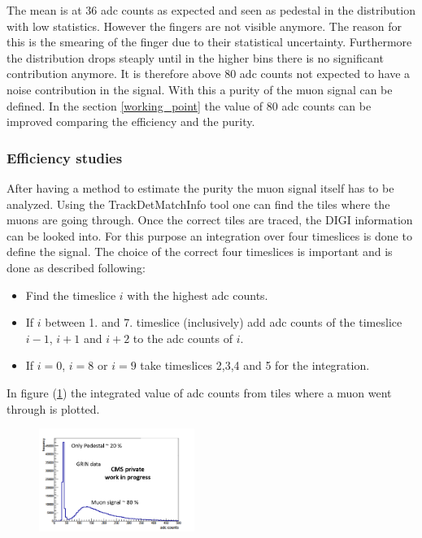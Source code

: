 			The mean is at 36 adc counts as expected and seen as pedestal in the distribution with low statistics.
			However the fingers are not visible anymore.
			The reason for this is the smearing of the finger due to their statistical uncertainty.
			Furthermore the distribution drops steaply until in the higher bins there is no significant contribution anymore.
			It is therefore above 80 adc counts not expected to have a noise contribution in the signal.
			With this a purity of the muon signal can be defined.
			In the section \ref{working_point} the value of 80 adc counts can be improved comparing the efficiency and the purity.
		\subsubsection{Efficiency studies}
			After having a method to estimate the purity the muon signal itself has to be analyzed.
			Using the TrackDetMatchInfo tool one can find the tiles where the muons are going through.
			Once the correct tiles are traced, the DIGI information can be looked into.
			For this purpose an integration over four timeslices is done to define the signal.
			The choice of the correct four timeslices is important and is done as described following:
			\begin{itemize}
			  \item Find the timeslice $i$ with the highest adc counts.
			  \item If $i$ between 1. and 7. timeslice (inclusively) add adc counts of the timeslice $i-1$, $i+1$ and $i+2$ to the adc counts of $i$.
			  \item If $i=0$, $i=8$ or $i=9$ take timeslices 2,3,4 and 5 for the integration.
			\end{itemize}
			In figure (\ref{fig:efficiency1x1}) the integrated value of adc counts from tiles where a muon went through is plotted.
			\begin{figure}[htbp]
				\centering
				\includegraphics[width=0.45\textwidth]{Figures/erdogan/efficiency1x1.png}
				\caption{}
				\label{fig:efficiency1x1}
			\end{figure}
